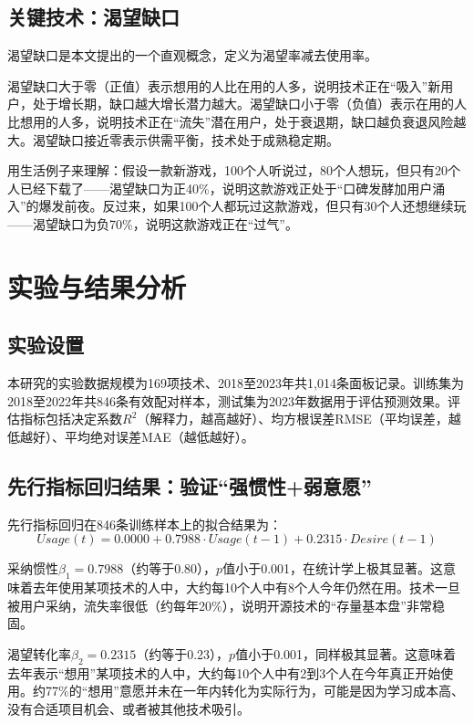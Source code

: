 \documentclass[fontset=windows]{cjc}
\begin{document}
\subsection{关键技术：渴望缺口}
渴望缺口是本文提出的一个直观概念，定义为渴望率减去使用率。

渴望缺口大于零（正值）表示想用的人比在用的人多，说明技术正在“吸入”新用户，处于增长期，缺口越大增长潜力越大。渴望缺口小于零（负值）表示在用的人比想用的人多，说明技术正在“流失”潜在用户，处于衰退期，缺口越负衰退风险越大。渴望缺口接近零表示供需平衡，技术处于成熟稳定期。

用生活例子来理解：假设一款新游戏，100个人听说过，80个人想玩，但只有20个人已经下载了——渴望缺口为正40\%，说明这款游戏正处于“口碑发酵加用户涌入”的爆发前夜。反过来，如果100个人都玩过这款游戏，但只有30个人还想继续玩——渴望缺口为负70\%，说明这款游戏正在“过气”。

\section{实验与结果分析}
\subsection{实验设置}
本研究的实验数据规模为169项技术、2018至2023年共1,014条面板记录。训练集为2018至2022年共846条有效配对样本，测试集为2023年数据用于评估预测效果。评估指标包括决定系数$R^2$（解释力，越高越好）、均方根误差RMSE（平均误差，越低越好）、平均绝对误差MAE（越低越好）。

\subsection{先行指标回归结果：验证“强惯性+弱意愿”}
先行指标回归在846条训练样本上的拟合结果为：
\begin{equation}
Usage(t) = 0.0000 + 0.7988 \cdot Usage(t-1) + 0.2315 \cdot Desire(t-1)
\end{equation}

采纳惯性$\beta_1 = 0.7988$（约等于0.80），$p$值小于0.001，在统计学上极其显著。这意味着去年使用某项技术的人中，大约每10个人中有8个人今年仍然在用。技术一旦被用户采纳，流失率很低（约每年20\%），说明开源技术的“存量基本盘”非常稳固。

渴望转化率$\beta_2 = 0.2315$（约等于0.23），$p$值小于0.001，同样极其显著。这意味着去年表示“想用”某项技术的人中，大约每10个人中有2到3个人在今年真正开始使用。约77\%的“想用”意愿并未在一年内转化为实际行为，可能是因为学习成本高、没有合适项目机会、或者被其他技术吸引。
\end{document}
